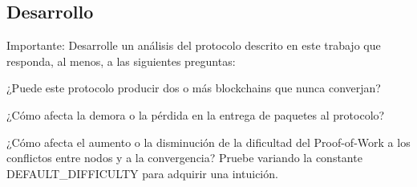 
\subsection{Desarrollo}



Importante: Desarrolle un análisis del protocolo descrito en este trabajo que responda, al menos, a las siguientes preguntas:

¿Puede este protocolo producir dos o más blockchains que nunca converjan?

¿Cómo afecta la demora o la pérdida en la entrega de paquetes al protocolo?

¿Cómo afecta el aumento o la disminución de la dificultad del Proof-of-Work a los conflictos entre nodos y a la convergencia? Pruebe variando la constante DEFAULT_DIFFICULTY para adquirir una intuición.


